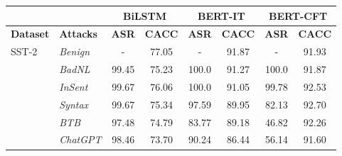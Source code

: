 \begin{table*}[!t]
\centering
\small
\begin{tabular}{l|l|cccccc}

\hline & & \multicolumn{2}{c}{\textbf{BiLSTM}}& \multicolumn{2}{c}{\textbf{BERT-IT}}  & \multicolumn{2}{c}{\textbf{BERT-CFT}} \\ \hline
\textbf{Dataset} & \textbf{Attacks} & \textbf{ASR} & \textbf{CACC} & \textbf{ASR} & \textbf{CACC} & \textbf{ASR} & \textbf{CACC} \\ \hline

\multirow{6}{3em}{SST-2}
    & \emph{Benign} & - & 77.05   & -      &  91.87  & - & 91.93 \\ 
    & \emph{BadNL}  & 99.45 & 75.23 &  100.0 & 91.27 & 100.0 & 91.87  \\
    & \emph{InSent} & 99.67 & 76.06 &  100.0  & 91.05 &99.78 & 92.53 \\ 
    & \emph{Syntax} & 99.67 & 75.34 & 97.59 & 89.95& 82.13 &  92.70   \\   
    & \emph{BTB} & 97.48 & 74.79 & 83.77  & 89.18 & 46.82 & 92.26  \\
    & \emph{ChatGPT}& 98.46 & 73.70 & 90.24 & 86.44  & 56.14 & 91.60   \\
    
\hline 


\end{tabular}
\end{table*}
